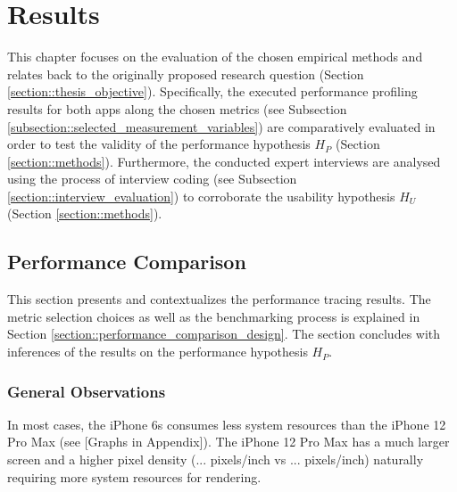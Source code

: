
\chapter{Results} \label{chapter::results}
This chapter focuses on the evaluation of the chosen empirical methods and relates back to the originally proposed research question (Section \ref{section::thesis_objective}).
Specifically, the executed performance profiling results for both apps
along the chosen metrics (see Subsection \ref{subsection::selected_measurement_variables}) are comparatively evaluated in order to test the validity of the performance hypothesis $H_P$ (Section \ref{section::methods}).
Furthermore, the conducted expert interviews are analysed using the process of interview coding (see Subsection \ref{section::interview_evaluation}) to corroborate the usability hypothesis $H_U$ (Section \ref{section::methods}).

\section{Performance Comparison} \label{section::performance_comparison}
This section presents and contextualizes the performance tracing results.
The metric selection choices as well as the benchmarking process is explained in Section \ref{section::performance_comparison_design}.
The section concludes with inferences of the results on the performance hypothesis $H_P$.

\subsection{General Observations}
In most cases, the iPhone 6s consumes less system resources than the iPhone 12 Pro Max (see [Graphs in Appendix]).
The iPhone 12 Pro Max has a much larger screen and a higher pixel density (... pixels/inch vs ... pixels/inch) naturally requiring more system resources for rendering.


